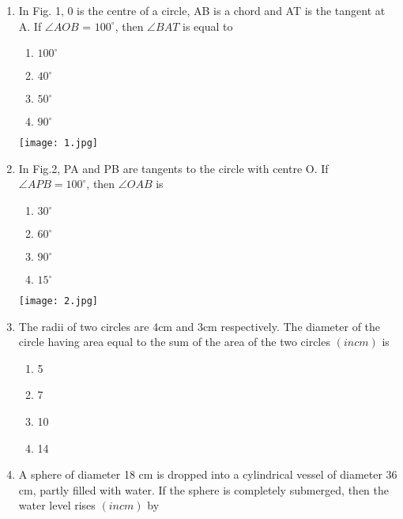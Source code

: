 \documentclass[12pt,-letter paper]{article}
\providecommand{\brak}[1]{\ensuremath{\left(#1\right)}}
\theoremstyle{remark}
\begin{document}
\begin{enumerate}
    \item In Fig. 1, 0 is the centre of a circle, AB is a chord and AT is the tangent at A. If $\angle AOB$ = $100^\circ$, then $\angle BAT$ is equal to \\
      \newcommand{\figone}{\texttt{[image: 1.jpg]}}
\begin{minipage}{0.15\textwidth} %
  \begin{enumerate}
    \item $100^\circ$
    \item $40^\circ$
    \item $50^\circ$
    \item $90^\circ$
  \end{enumerate}
\end{minipage}
\hspace{3cm} %
\figone 
    \item In Fig.2, PA and PB are tangents to the circle with centre O. If $\angle APB=100^\circ$, then $\angle OAB$ is\\
       \newcommand{\figtwo}{\texttt{[image: 2.jpg]}}
\begin{minipage}{0.15\textwidth} %
  \begin{enumerate}
    \item $30^\circ$
    \item $60^\circ$
    \item $90^\circ$
    \item $15^\circ$
  \end{enumerate}
\end{minipage}
\hspace{3cm} %
\figtwo 
    \item The radii of two circles are 4cm and 3cm respectively. The diameter of the circle having area equal to the sum of the area of the two circles $\brak{in cm}$ is
    \begin{enumerate}
        \item 5
        \item 7 
        \item 10
        \item 14
    \end{enumerate}
    \item A sphere of diameter 18 cm is dropped into a cylindrical vessel of diameter 36 cm, partly filled with water. If the sphere is completely submerged, then the water level rises $\brak{in cm}$ by
    \begin{enumerate}

\end{enumerate}
\end{enumerate}
\end{document}
